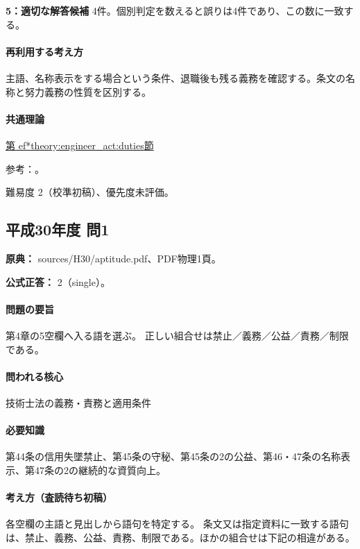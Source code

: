 \noindent\textbf{5：適切な解答候補} 4件。個別判定を数えると誤りは4件であり、この数に一致する。\par

\paragraph{再利用する考え方} 主語、名称表示をする場合という条件、退職後も残る義務を確認する。条文の名称と努力義務の性質を区別する。

\paragraph{共通理論} \hyperref[theory:engineer_act:duties]{第
ef*{theory:engineer_act:duties}節}

\par 参考：\cite{engineer_act_current}。

\par 難易度 2（校準初稿）、優先度未評価。

\subsection{平成30年度 問1}
\label{q:h30-reg-apt-01}

\noindent\textbf{原典：} sources/H30/aptitude.pdf、PDF物理1頁。

\textbf{公式正答：} 2（single）。

\paragraph{問題の要旨} 第4章の5空欄へ入る語を選ぶ。 正しい組合せは禁止／義務／公益／責務／制限である。

\paragraph{問われる核心} 技術士法の義務・責務と適用条件

\paragraph{必要知識} 第44条の信用失墜禁止、第45条の守秘、第45条の2の公益、第46・47条の名称表示、第47条の2の継続的な資質向上。

\paragraph{考え方（査読待ち初稿）} 各空欄の主語と見出しから語句を特定する。 条文又は指定資料に一致する語句は、禁止、義務、公益、責務、制限である。ほかの組合せは下記の相違がある。

